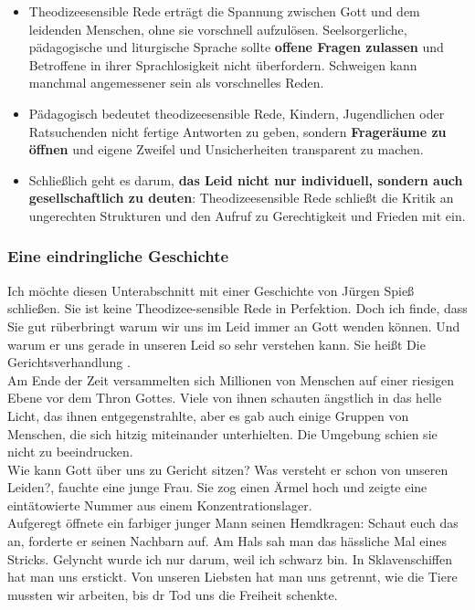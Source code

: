 \begin{itemize}
    \item Theodizeesensible Rede erträgt die Spannung zwischen Gott und dem leidenden Menschen, ohne sie vorschnell aufzulösen. Seelsorgerliche, pädagogische und liturgische Sprache sollte \textbf{offene Fragen zulassen} und Betroffene in ihrer Sprachlosigkeit nicht überfordern. Schweigen kann manchmal angemessener sein als vorschnelles Reden.
    \item Pädagogisch bedeutet theodizeesensible Rede, Kindern, Jugendlichen oder Ratsuchenden nicht fertige Antworten zu geben, sondern \textbf{Frageräume zu öffnen} und eigene Zweifel und Unsicherheiten transparent zu machen.
    \item Schließlich geht es darum, \textbf{das Leid nicht nur individuell, sondern auch gesellschaftlich zu deuten}: Theodizeesensible Rede schließt die Kritik an ungerechten Strukturen und den Aufruf zu Gerechtigkeit und Frieden mit ein.
\end{itemize}

\subsubsection{Eine eindringliche Geschichte}
Ich möchte diesen Unterabschnitt mit einer Geschichte von Jürgen Spieß schließen. Sie ist keine Theodizee-sensible Rede in Perfektion. Doch ich finde, dass Sie gut rüberbringt warum wir uns im Leid immer an Gott wenden können. Und warum er uns gerade in unseren Leid so sehr verstehen kann. Sie heißt \glqq Die Gerichtsverhandlung \grqq{}.\\

Am Ende der Zeit versammelten sich Millionen von Menschen auf einer riesigen Ebene vor dem Thron Gottes. Viele von ihnen schauten ängstlich in das helle Licht, das ihnen entgegenstrahlte, aber es gab auch einige Gruppen von Menschen, die sich hitzig miteinander unterhielten. Die Umgebung schien sie nicht zu beeindrucken.\\

\glqq Wie kann Gott über uns zu Gericht sitzen? Was versteht er schon von unseren Leiden?\grqq{}, fauchte eine junge Frau. Sie zog einen Ärmel hoch und zeigte eine eintätowierte Nummer aus einem Konzentrationslager.\\

Aufgeregt öffnete ein farbiger junger Mann seinen Hemdkragen: \glqq Schaut euch das an\grqq{}, forderte er seinen Nachbarn auf. Am Hals sah man das hässliche Mal eines Stricks. \glqq Gelyncht wurde ich nur darum, weil ich schwarz bin. In Sklavenschiffen hat man uns erstickt. Von unseren Liebsten hat man uns getrennt, wie die Tiere mussten wir arbeiten, bis dr Tod uns die Freiheit schenkte.\grqq{}\\

